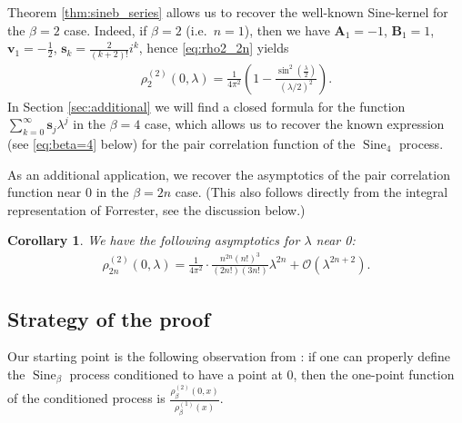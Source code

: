 \documentclass[12pt]{article}
\newtheorem{corollary}[theorem]{Corollary}
\theoremstyle{definition} %
\theoremstyle{remark} %
\newcommand{\Sineb}{\operatorname{Sine}_{\beta}}
\newcommand{\Sine}{\operatorname{Sine}}
\begin{document}
Theorem \ref{thm:sineb_series} allows us to recover the well-known Sine-kernel for the $\beta=2$ case. Indeed, if  $\beta=2$ (i.e.~$n=1$), then we have $\mathbf{A}_1=-1$, $\mathbf{B}_1=1$, $\mathbf{v}_1=-\tfrac{1}{2}$,  $\mathbf{s}_k=\tfrac2{(k+2)!} i^k $, hence \eqref{eq:rho2_2n} yields
\begin{align}\label{eq:sine_kernel}
    \rho_{2}^{(2)}(0,\lambda)=\frac{1}{4\pi^2}\left(1-\frac{\sin^2(\tfrac{\lambda}{2})}{(\lambda/2)^2}\right).
\end{align}
In Section \ref{sec:additional} we will find a closed formula for the function $\sum_{k=0}^\infty \mathbf{s}_{j}  \lambda^{j}$ in the $\beta=4$ case, which allows us to recover the known expression (see \eqref{eq:beta=4} below) for the pair correlation function of the $\Sine_4$ process.

As an additional application, we recover the asymptotics of the pair correlation function near 0 in the $\beta=2n$ case. (This also follows directly from the integral representation of Forrester, see the discussion below.) 

\begin{corollary}\label{cor:small_lambda}
  We have the following asymptotics for $\lambda$ near 0:  
  \begin{align}\label{eq:small_lambda}
      \rho_{2n}^{(2)}(0,\lambda)= \frac1{4\pi^2} \cdot \frac{n^{2n} (n!)^3 }{(2n!)(3n!) }\lambda^{2n}+\mathcal{O}(\lambda^{2n+2}).
  \end{align}
  
\end{corollary}



\subsection*{Strategy of the proof}

Our starting point is the following observation from \cite{BVBV_Palm}: if one can properly define the $\Sineb$ process conditioned to have a point at 0, then the one-point function of the conditioned process is  $\frac{\rho_\beta^{(2)}(0,x)}{\rho_\beta^{(1)}(x)}$. 
\end{document}
